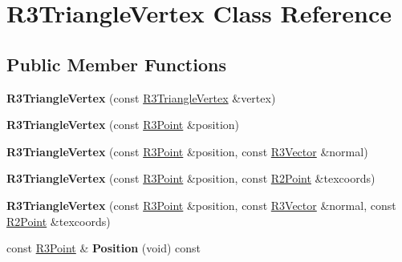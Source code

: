 \hypertarget{class_r3_triangle_vertex}{}\section{R3\+Triangle\+Vertex Class Reference}
\label{class_r3_triangle_vertex}
\subsection*{Public Member Functions}
\begin{DoxyCompactItemize}
\item 
{\bfseries R3\+Triangle\+Vertex} (const \hyperlink{class_r3_triangle_vertex}{R3\+Triangle\+Vertex} \&vertex)\hypertarget{class_r3_triangle_vertex_a8988dc7c8330a481a2876fbf6e6a2e1f}{}\label{class_r3_triangle_vertex_a8988dc7c8330a481a2876fbf6e6a2e1f}

\item 
{\bfseries R3\+Triangle\+Vertex} (const \hyperlink{class_r3_point}{R3\+Point} \&position)\hypertarget{class_r3_triangle_vertex_ab1a61b74d0ced86b688861d358383bfd}{}\label{class_r3_triangle_vertex_ab1a61b74d0ced86b688861d358383bfd}

\item 
{\bfseries R3\+Triangle\+Vertex} (const \hyperlink{class_r3_point}{R3\+Point} \&position, const \hyperlink{class_r3_vector}{R3\+Vector} \&normal)\hypertarget{class_r3_triangle_vertex_a1399a9fbd326d7ebee83f07ee8c740e5}{}\label{class_r3_triangle_vertex_a1399a9fbd326d7ebee83f07ee8c740e5}

\item 
{\bfseries R3\+Triangle\+Vertex} (const \hyperlink{class_r3_point}{R3\+Point} \&position, const \hyperlink{class_r2_point}{R2\+Point} \&texcoords)\hypertarget{class_r3_triangle_vertex_a0363a051e5f7ccd092ee33b8ad9d52b8}{}\label{class_r3_triangle_vertex_a0363a051e5f7ccd092ee33b8ad9d52b8}

\item 
{\bfseries R3\+Triangle\+Vertex} (const \hyperlink{class_r3_point}{R3\+Point} \&position, const \hyperlink{class_r3_vector}{R3\+Vector} \&normal, const \hyperlink{class_r2_point}{R2\+Point} \&texcoords)\hypertarget{class_r3_triangle_vertex_a30cc746b21801f77be5436d66f5280db}{}\label{class_r3_triangle_vertex_a30cc746b21801f77be5436d66f5280db}

\item 
const \hyperlink{class_r3_point}{R3\+Point} \& {\bfseries Position} (void) const \hypertarget{class_r3_triangle_vertex_a3d173e1ff6d467442fb80b492e2a0e31}{}\label{class_r3_triangle_vertex_a3d173e1ff6d467442fb80b492e2a0e31}


\end{DoxyCompactItemize}
